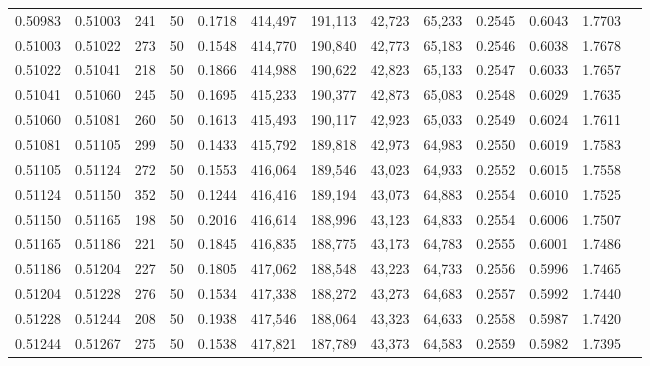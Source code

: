 \begin{tabular}{rrrrrrrrrrrrr}
0.50983 & 0.51003 &   241 &  50 &                                     0.1718 & 414,497 & 191,113 &  42,723 &  65,233 & 0.2545 & 0.6043 & 1.7703 \\
0.51003 & 0.51022 &   273 &  50 &                                     0.1548 & 414,770 & 190,840 &  42,773 &  65,183 & 0.2546 & 0.6038 & 1.7678 \\
0.51022 & 0.51041 &   218 &  50 &                                     0.1866 & 414,988 & 190,622 &  42,823 &  65,133 & 0.2547 & 0.6033 & 1.7657 \\
0.51041 & 0.51060 &   245 &  50 &                                     0.1695 & 415,233 & 190,377 &  42,873 &  65,083 & 0.2548 & 0.6029 & 1.7635 \\
0.51060 & 0.51081 &   260 &  50 &                                     0.1613 & 415,493 & 190,117 &  42,923 &  65,033 & 0.2549 & 0.6024 & 1.7611 \\
0.51081 & 0.51105 &   299 &  50 &                                     0.1433 & 415,792 & 189,818 &  42,973 &  64,983 & 0.2550 & 0.6019 & 1.7583 \\
0.51105 & 0.51124 &   272 &  50 &                                     0.1553 & 416,064 & 189,546 &  43,023 &  64,933 & 0.2552 & 0.6015 & 1.7558 \\
0.51124 & 0.51150 &   352 &  50 &                                     0.1244 & 416,416 & 189,194 &  43,073 &  64,883 & 0.2554 & 0.6010 & 1.7525 \\
0.51150 & 0.51165 &   198 &  50 &                                     0.2016 & 416,614 & 188,996 &  43,123 &  64,833 & 0.2554 & 0.6006 & 1.7507 \\
0.51165 & 0.51186 &   221 &  50 &                                     0.1845 & 416,835 & 188,775 &  43,173 &  64,783 & 0.2555 & 0.6001 & 1.7486 \\
0.51186 & 0.51204 &   227 &  50 &                                     0.1805 & 417,062 & 188,548 &  43,223 &  64,733 & 0.2556 & 0.5996 & 1.7465 \\
0.51204 & 0.51228 &   276 &  50 &                                     0.1534 & 417,338 & 188,272 &  43,273 &  64,683 & 0.2557 & 0.5992 & 1.7440 \\
0.51228 & 0.51244 &   208 &  50 &                                     0.1938 & 417,546 & 188,064 &  43,323 &  64,633 & 0.2558 & 0.5987 & 1.7420 \\
0.51244 & 0.51267 &   275 &  50 &                                     0.1538 & 417,821 & 187,789 &  43,373 &  64,583 & 0.2559 & 0.5982 & 1.7395 \\

\end{tabular}
